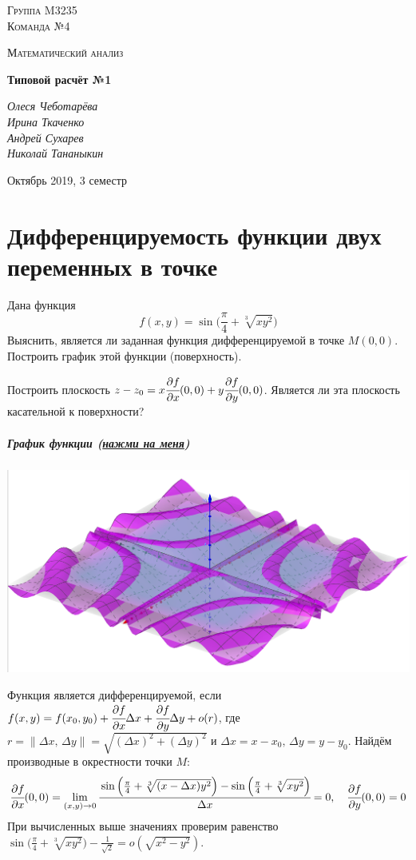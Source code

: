 \documentclass[12pt]{report}
\begin{document}
\begin{titlepage}
	\centering
	{\scshape\LARGE Группа M3235\protect\\Команда №4 \par}
	\vspace{1cm}
	{\scshape\Large Математический анализ\par}
	\vspace{1.5cm}
	{\huge\bfseries Типовой расчёт №1\par}
	\vspace{2cm}
	{\Large\itshape Олеся Чеботарёва\protect\\Ирина Ткаченко\protect\\Андрей Сухарев\protect\\Николай Тананыкин \par}
	\vfill
	\vfill
	{\large Октябрь 2019, 3 семестр \par}
\end{titlepage}
\tableofcontents
\newpage
\chapter{Дифференцируемость функции двух переменных в точке}
Дана функция
$$ f(x,y)=\sin\Big(\frac{\pi}{4}+\sqrt[3]{xy^2}\Big) $$
Выяснить, является ли заданная функция дифференцируемой в точке $M(0, 0)$. Построить график этой функции (поверхность). 

Построить плоскость $z-z_0=x\cfrac{\partial f}{\partial x}(0,0)+y\cfrac{\partial f}{\partial y}(0,0)$. Является ли эта плоскость касательной к поверхности?
\newpage
\paragraph{График функции (\href{https://www.geogebra.org/3d/kjp5s8yt}{нажми на меня})}
\begin{center}
\includegraphics[scale=0.45]{task1.png}
\end{center}
Функция является дифференцируемой, если $f(x,y)=f(x_0,y_0)+\cfrac{\partial f}{\partial x}\Delta x+\cfrac{\partial f}{\partial y}\Delta y+o(r)$, где $r=\|\Delta x,\,\Delta y\|=\sqrt{(\Delta x)^2+(\Delta y)^2}$ и $\Delta x=x-x_0,\,\Delta y=y-y_0$. Найдём производные в окрестности точки $M$:
$$ \cfrac{\partial f}{\partial x}(0,0) = \lim_{(x,y)\to 0}\cfrac{\sin\Big(\frac{\pi}{4}+\sqrt[3]{(x-\Delta x)y^2}\Big)-\sin\Big(\frac{\pi}{4}+\sqrt[3]{xy^2}\Big)}{\Delta x}=0,\quad \cfrac{\partial f}{\partial y}(0,0) =0 $$
При вычисленных выше значениях проверим равенство $\sin\Big(\frac{\pi}{4}+\sqrt[3]{xy^2}\Big)-\frac{1}{\sqrt{2}}=o(\sqrt{x^2-y^2})$.
\end{document}
